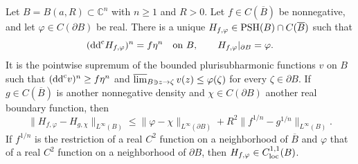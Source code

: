 \begin{theorem}\label{thm:continuous-density-ball-dirichlet}
Let $B=B(a,R)\subset\mathbb C^n$ with $n\ge1$ and $R>0$. Let $f\in C(\overline B)$ be nonnegative, and let $\varphi\in C(\partial B)$ be real. There is a unique $H_{f,\varphi}\in\mathrm{PSH}(B)\cap C(\overline B)$ such that
\[
 (\mathrm{dd}^{\mathrm{c}} H_{f,\varphi})^n=f\eta^n\quad\text{on }B,
 \qquad H_{f,\varphi}|_{\partial B}=\varphi.
\]
It is the pointwise supremum of the bounded plurisubharmonic functions $v$ on $B$ such that $(\mathrm{dd}^{\mathrm{c}} v)^n\ge f\eta^n$ and $\varlimsup_{B\ni z\to\zeta}v(z)\le\varphi(\zeta)$ for every $\zeta\in\partial B$. If $g\in C(\overline B)$ is another nonnegative density and $\chi\in C(\partial B)$ another real boundary function, then
\begin{equation}\label{eq:ball-dirichlet-root-stability}
 \|H_{f,\varphi}-H_{g,\chi}\|_{L^\infty(B)}
 \le\|\varphi-\chi\|_{L^\infty(\partial B)}
       +R^2\|f^{1/n}-g^{1/n}\|_{L^\infty(B)}.
\end{equation}
If $f^{1/n}$ is the restriction of a real $C^2$ function on a neighborhood of $\overline B$ and $\varphi$ that of a real $C^2$ function on a neighborhood of $\partial B$, then $H_{f,\varphi}\in C^{1,1}_{\mathrm{loc}}(B)$.
\end{theorem}
